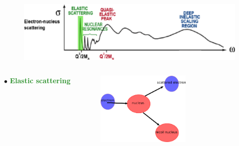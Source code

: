 \documentclass[12pt,usenames,dvipsnames]{beamer}
\begin{document}

\begin{frame}

\begin{figure}[]
\centering
\includegraphics[width=12cm]{../images/Thesis/E_nucleus_spect_Elas.png}
\end{figure}
\begin{columns}[c] %
$\bullet$ \textbf{\textcolor{ForestGreen}{Elastic scattering}}\\
\vspace{-30pt}
\begin{figure}[]
\includegraphics[height=3.5cm]{../images/elast_draw.png}
\end{figure}





\end{columns}
\end{frame}

\end{document}

